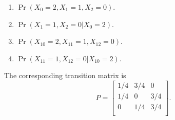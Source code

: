 \documentclass[
]{book}
\theoremstyle{definition}
\theoremstyle{definition}
\theoremstyle{definition}
\theoremstyle{definition}
\theoremstyle{remark}
\begin{document}
\begin{enumerate}
\def\labelenumi{\arabic{enumi}.}
\item
  \(\Pr(X_0 = 2, X_1 = 1, X_2 = 0).\)
\item
  \(\Pr( X_1 = 1, X_2 = 0 | X_0 = 2).\)
\item
  \(\Pr(X_{10} = 2, X_{11} = 1, X_{12} = 0).\)
\item
  \(\Pr( X_{11} = 1, X_{12} = 0 | X_{10} = 2).\)
\end{enumerate}

The corresponding transition matrix is \[P = \begin{bmatrix}
    1/4 & 3/4 & 0    \\
    1/4 & 0 & 3/4   \\
    0 & 1/4 & 3/4    \\
\end{bmatrix}.\]
\end{document}
